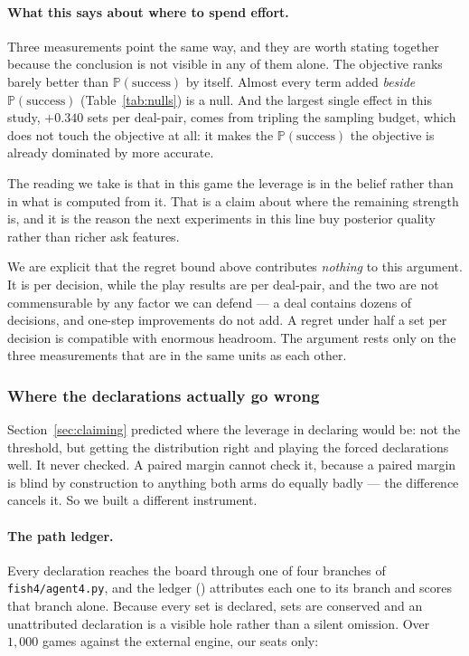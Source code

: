 \documentclass[11pt,letterpaper]{article}
\newcommand{\Prob}{\ensuremath{\mathbb{P}}}
\begin{document}
\paragraph{What this says about where to spend effort.} Three measurements point
the same way, and they are worth stating together because the conclusion is not
visible in any of them alone. The objective ranks barely better than
$\Prob(\text{success})$ by itself. Almost every term added \emph{beside}
$\Prob(\text{success})$ (Table~\ref{tab:nulls}) is a null. And the largest
single effect in this study, $+0.340$ sets per deal-pair, comes from tripling the
sampling budget, which does not touch the objective at all: it makes the
$\Prob(\text{success})$ the objective is already dominated by more accurate.

The reading we take is that in this game the leverage is in the belief rather
than in what is computed from it. That is a claim about where the remaining
strength is, and it is the reason the next experiments in this line buy
posterior quality rather than richer ask features.

We are explicit that the regret bound above contributes \emph{nothing} to this
argument. It is per decision, while the play results are per deal-pair, and the
two are not commensurable by any factor we can defend --- a deal contains dozens
of decisions, and one-step improvements do not add. A regret under half a set per
decision is compatible with enormous headroom. The argument rests only on the
three measurements that are in the same units as each other.

\subsubsection{Where the declarations actually go wrong}
\label{sec:res-pathledger}

Section~\ref{sec:claiming} predicted where the leverage in declaring would be:
not the threshold, but getting the distribution right and playing the forced
declarations well. It never checked. A paired margin cannot check it, because a
paired margin is blind by construction to anything both arms do equally badly
--- the difference cancels it. So we built a different instrument.

\paragraph{The path ledger.} Every declaration reaches the board through one
of four branches of \texttt{fish4/agent4.py}, and the ledger
() attributes each one to its branch and scores
that branch alone. Because every set is declared, sets are conserved and an
unattributed declaration is a visible hole rather than a silent omission. Over
$1{,}000$ games against the external engine, our seats only:
\end{document}
